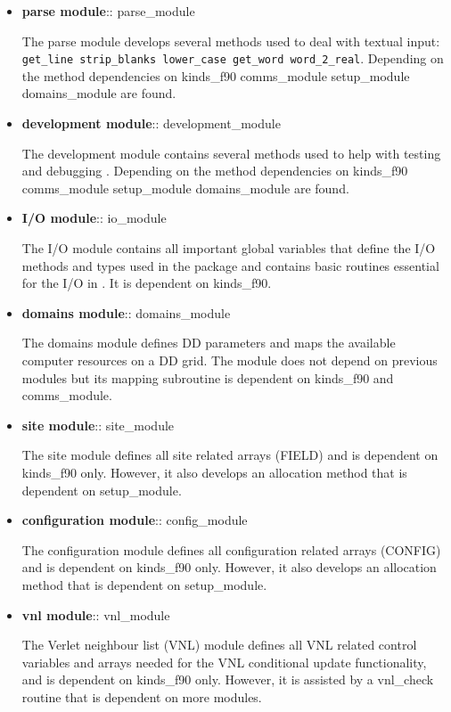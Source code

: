 \begin{itemize}
\item {\bf parse module}:: {\sc parse\_module}

The parse module develops several methods used to deal with
textual input: {\tt get\_line strip\_blanks lower\_case get\_word
word\_2\_real}.  Depending on the method dependencies on
{\sc kinds\_f90 comms\_module setup\_module domains\_module} are found.

\item {\bf development module}:: {\sc development\_module}

The development module contains several methods used to help with
testing and debugging \D.  Depending on the method dependencies on
{\sc kinds\_f90 comms\_module setup\_module domains\_module} are found.

\item {\bf I/O module}:: {\sc io\_module}

The I/O module contains all important global variables that define
the I/O methods and types used in the package and contains
basic routines essential for the I/O in \D.  It is dependent on
{\sc kinds\_f90}.

\item {\bf domains module}:: {\sc domains\_module}

The domains module defines DD parameters and maps the available
computer resources on a DD grid.  The module does not depend on
previous modules but its mapping subroutine is dependent on
{\sc kinds\_f90} and {\sc comms\_module}.

\item {\bf site module}:: {\sc site\_module}

The site module defines all site related arrays (FIELD) and is
dependent on {\sc kinds\_f90} only.  However, it also develops an
allocation method that is dependent on {\sc setup\_module}.

\item {\bf configuration module}:: {\sc config\_module}

The configuration module defines all configuration related arrays
(CONFIG) and is dependent on {\sc kinds\_f90} only.  However, it
also develops an allocation method that is dependent on
{\sc setup\_module}.

\item {\bf vnl module}:: {\sc vnl\_module}

The Verlet neighbour list (VNL) module defines all VNL related
control variables and arrays needed for the VNL conditional
update functionality, and is dependent on {\sc kinds\_f90} only.
However, it is assisted by a {\sc vnl\_check} routine that is
dependent on more modules.


\end{itemize}
